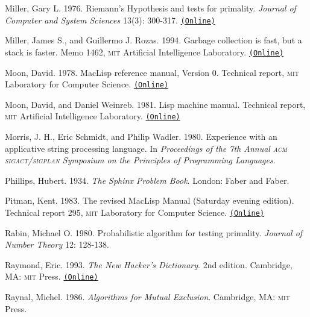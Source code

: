 \documentclass[oneside]{book}
\newcommand{\acronym}[1]{\textsc{\MakeLowercase{#1}}}
\newcommand{\code}[1]{\texttt{#1}}
\begin{document}
 \label{Miller 1976}
Miller, Gary L.  1976.  Riemann's Hypothesis and tests for primality.
\textit{Journal of Computer and System Sciences} 13(3): 300-317.
\href{http://www.cs.cmu.edu/~glmiller/Publications/b2hd-Mi76.html}{\code{(Online)}}

 \label{Miller and Rozas 1994}
Miller, James S., and Guillermo J. Rozas. 1994.  Garbage collection is fast,
but a stack is faster.  Memo 1462, \acronym{MIT} Artificial Intelligence
Laboratory.
\href{http://dspace.mit.edu/handle/1721.1/6622}{\code{(Online)}}

 \label{Moon 1978}
Moon, David.  1978.  MacLisp reference manual, Version 0.  Technical report,
\acronym{MIT} Laboratory for Computer Science.
\href{http://www.softwarepreservation.org/projects/LISP/MIT/Moon-MACLISP_Reference_Manual-Apr_08_1974.pdf/view}{\code{(Online)}}

 \label{Moon and Weinreb 1981}
Moon, David, and Daniel Weinreb.  1981.  Lisp machine manual.  Technical
report, \acronym{MIT} Artificial Intelligence Laboratory.
\href{http://www.unlambda.com/lmman/index.html}{\code{(Online)}}

 \label{Morris et al. 1980}
Morris, J. H., Eric Schmidt, and Philip Wadler.  1980.  Experience with an
applicative string processing language.  In \textit{Proceedings of the 7th Annual
\acronym{ACM} \acronym{SIGACT}/\acronym{SIGPLAN} Symposium on the Principles of
Programming Languages}.

 \label{Phillips 1934}
Phillips, Hubert.  1934. \textit{The Sphinx Problem Book}.  London: Faber and
Faber.

 \label{Pitman 1983}
Pitman, Kent. 1983. The revised MacLisp Manual (Saturday evening edition).
Technical report 295, \acronym{MIT} Laboratory for Computer Science.
\href{http://maclisp.info/pitmanual}{\code{(Online)}}

 \label{Rabin 1980}
Rabin, Michael O. 1980. Probabilistic algorithm for testing primality.
\textit{Journal of Number Theory} 12: 128-138.

 \label{Raymond 1993}
Raymond, Eric.  1993. \textit{The New Hacker's Dictionary}. 2nd edition.
Cambridge, MA: \acronym{MIT} Press.
\href{http://www.outpost9.com/reference/jargon/jargon_toc.html}{\code{(Online)}}

Raynal, Michel. 1986. \textit{Algorithms for Mutual Exclusion}.  Cambridge, MA:
\acronym{MIT} Press.
\end{document}
